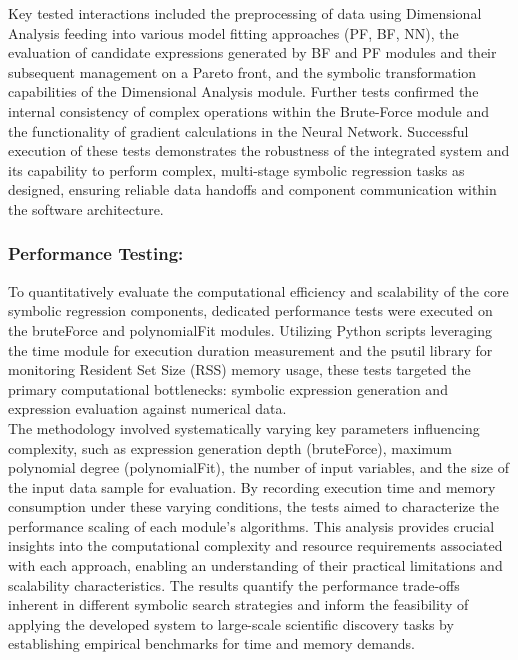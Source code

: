\documentclass{article}
\begin{document}
Key tested interactions included the preprocessing of data using Dimensional Analysis feeding into various model fitting approaches (PF, BF, NN), the evaluation of candidate expressions generated by BF and PF modules and their subsequent management on a Pareto front, and the symbolic transformation capabilities of the Dimensional Analysis module. Further tests confirmed the internal consistency of complex operations within the Brute-Force module and the functionality of gradient calculations in the Neural Network. Successful execution of these tests demonstrates the robustness of the integrated system and its capability to perform complex, multi-stage symbolic regression tasks as designed, ensuring reliable data handoffs and component communication within the software architecture.\\


\subsubsection{Performance Testing: }

To quantitatively evaluate the computational efficiency and scalability of the core symbolic regression components, dedicated performance tests were executed on the bruteForce and polynomialFit modules. Utilizing Python scripts leveraging the time module for execution duration measurement and the psutil library for monitoring Resident Set Size (RSS) memory usage, these tests targeted the primary computational bottlenecks: symbolic expression generation and expression evaluation against numerical data.\\

The methodology involved systematically varying key parameters influencing complexity, such as expression generation depth (bruteForce), maximum polynomial degree (polynomialFit), the number of input variables, and the size of the input data sample for evaluation. By recording execution time and memory consumption under these varying conditions, the tests aimed to characterize the performance scaling of each module's algorithms. This analysis provides crucial insights into the computational complexity and resource requirements associated with each approach, enabling an understanding of their practical limitations and scalability characteristics. The results quantify the performance trade-offs inherent in different symbolic search strategies and inform the feasibility of applying the developed system to large-scale scientific discovery tasks by establishing empirical benchmarks for time and memory demands.\\
\end{document}
